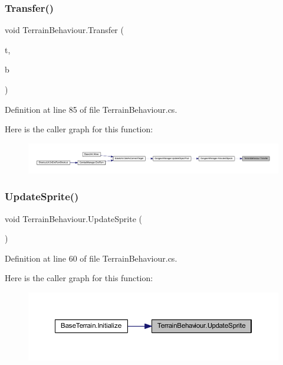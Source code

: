 \subsubsection{\texorpdfstring{Transfer()}{Transfer()}}
{\footnotesize\ttfamily void Terrain\+Behaviour.\+Transfer (\begin{DoxyParamCaption}\item[{\mbox{\hyperlink{class_tile}{Tile}}}]{t,  }\item[{\mbox{\hyperlink{class_base_terrain}{Base\+Terrain}}}]{b }\end{DoxyParamCaption})}



Definition at line 85 of file Terrain\+Behaviour.\+cs.

Here is the caller graph for this function\+:
\nopagebreak
\begin{figure}[H]
\begin{center}
\leavevmode
\includegraphics[width=350pt]{class_terrain_behaviour_a97b6323eafb1c26361878bb1d37f4556_icgraph}
\end{center}
\end{figure}
\mbox{\label{class_terrain_behaviour_a1f1234296c90b45abf0ad3ee6f9e78ac}} 
\subsubsection{\texorpdfstring{UpdateSprite()}{UpdateSprite()}}
{\footnotesize\ttfamily void Terrain\+Behaviour.\+Update\+Sprite (\begin{DoxyParamCaption}{ }\end{DoxyParamCaption})}



Definition at line 60 of file Terrain\+Behaviour.\+cs.

Here is the caller graph for this function\+:
\nopagebreak
\begin{figure}[H]
\begin{center}
\leavevmode
\includegraphics[width=350pt]{class_terrain_behaviour_a1f1234296c90b45abf0ad3ee6f9e78ac_icgraph}
\end{center}
\end{figure}


